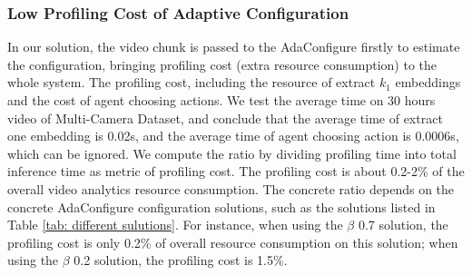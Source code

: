 
 
 
\subsubsection{Low Profiling Cost of Adaptive Configuration}
\label{subsec: profiling cost}
In our solution, the video chunk is passed to the AdaConfigure firstly to estimate the configuration, bringing profiling cost (extra resource consumption) to the whole system. 
The profiling cost, including the resource of extract $k_1$ embeddings and the cost of agent choosing actions. We test the average time on 30 hours video of Multi-Camera Dataset, and conclude that the average time of extract one embedding is 0.02s, and the average time of agent choosing action is 0.0006s, which can be ignored. We compute the ratio by dividing profiling time into total inference time as metric of profiling cost.
The profiling cost is about 0.2-2\% of the overall video analytics resource consumption. The concrete ratio depends on the concrete AdaConfigure configuration solutions, such as the solutions listed in Table \ref{tab: different sulutions}. For instance, when using the $\beta$ 0.7 solution, the profiling cost is only 0.2\% of overall resource consumption on this solution; when using the $\beta$ 0.2 solution, the profiling cost is 1.5\%.        

